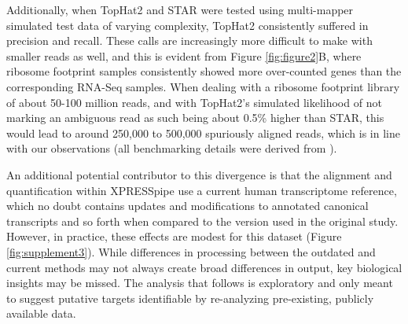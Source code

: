 \documentclass[10pt, oneside]{article}
\begin{document}
\begin{multicols}{2}
Additionally, when TopHat2 and STAR were tested using multi-mapper simulated test data of varying complexity, TopHat2 consistently suffered in precision and recall. These calls are increasingly more difficult to make with smaller reads as well, and this is evident from Figure \ref{fig:figure2}B, where ribosome footprint samples consistently showed more over-counted genes than the corresponding RNA-Seq samples. When dealing with a ribosome footprint library of about 50-100 million reads, and with TopHat2's simulated likelihood of not marking an ambiguous read as such being about 0.5\% higher than STAR, this would lead to around 250,000 to 500,000 spuriously aligned reads, which is in line with our observations (all benchmarking details were derived from \cite{alignment_benchmark}). \par

An additional potential contributor to this divergence is that the alignment and quantification within XPRESSpipe use a current human transcriptome reference, which no doubt contains updates and modifications to annotated canonical transcripts and so forth when compared to the version used in the original study. However, in practice, these effects are modest for this dataset (Figure \ref{fig:supplement3}). While differences in processing between the outdated and current methods may not always create broad differences in output, key biological insights may be missed. The analysis that follows is exploratory and only meant to suggest putative targets identifiable by re-analyzing pre-existing, publicly available data. \par


\end{multicols}
\end{document}
